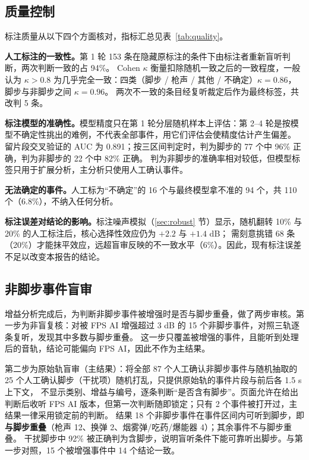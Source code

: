 \documentclass[11pt,a4paper]{ctexart}
\begin{document}


\subsection{质量控制}
标注质量从以下四个方面核对，指标汇总见表~\ref{tab:quality}。

\textbf{人工标注的一致性。}第 1 轮 153 条在隐藏原标注的条件下由标注者重新盲听判断，两次判断一致的占 94\%。
Cohen $\kappa$ 衡量扣除随机一致之后的一致程度，一般认为 $\kappa>0.8$ 为几乎完全一致：四类（脚步 / 枪声 / 其他 / 不确定）$\kappa=0.86$，脚步与非脚步之间 $\kappa=0.96$。
两次不一致的条目经复听裁定后作为最终标签，共改判 5 条。

\textbf{标注模型的准确性。}模型精度只在第 1 轮分层随机样本上评估：第 2--4 轮是按模型不确定性挑出的难例，不代表全部事件，用它们评估会使精度估计产生偏差。
留片段交叉验证的 AUC 为 0.891；按三区间判定时，判为脚步的 77 个中 96\% 正确，判为非脚步的 22 个中 82\% 正确。
判为非脚步的准确率相对较低，但模型标签只用于扩展分析，主分析只使用人工确认事件。

\textbf{无法确定的事件。}人工标为“不确定”的 16 个与最终模型拿不准的 94 个，共 110 个（6.8\%），不纳入任何分析。

\textbf{标注误差对结论的影响。}标注噪声模拟（\ref{sec:robust} 节）显示，随机翻转 10\% 与 20\% 的人工标注后，核心选择性效应仍为 $+2.2$ 与 $+1.4$ dB；
需刻意挑错 68 条（20\%）才能抹平效应，远超盲审反映的不一致水平（6\%）。因此，现有标注误差不足以改变本报告的结论。



\subsection{非脚步事件盲审}\label{sec:boostrv}
增益分析完成后，为判断非脚步事件被增强时是否与脚步重叠，做了两步审核。第一步为非盲复核：对被 FPS AI 增强超过 3 dB 的 15 个非脚步事件，对照三轨逐条复听，发现其中多数与脚步重叠。
这一步只覆盖被增强的事件，且能听到处理后的音轨，结论可能偏向 FPS AI，因此不作为主结果。

第二步为原始轨盲审（主结果）：将全部 87 个人工确认非脚步事件与随机抽取的 25 个人工确认脚步（干扰项）随机打乱，只提供原始轨的事件片段与前后各 1.5 s 上下文，
不显示类别、增益与编号，逐条判断“是否含有脚步”。页面允许在给出判断后收听 FPS AI 版本，但第一次判断随即锁定；只有 2 个事件被打开过，主结果一律采用锁定前的判断。
结果 18 个非脚步事件在事件区间内可听到脚步，即\textbf{与脚步重叠}（枪声 12、换弹 2、烟雾弹/吃药/爆能器 4）；其余事件不与脚步重叠。
干扰脚步中 92\% 被正确判为含脚步，说明盲听条件下能可靠听出脚步。与第一步对照，15 个被增强事件中 14 个结论一致。
\end{document}
